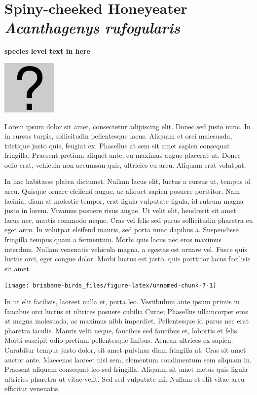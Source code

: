 \documentclass[]{book}
\let\origfigure\figure
\let\endorigfigure\endfigure
\renewenvironment{figure}[1][2] {
  \expandafter\origfigure\expandafter[H]
} {
  \endorigfigure
}
\begin{document}
\section{\texorpdfstring{Spiny-cheeked Honeyeater \emph{Acanthagenys
rufogularis}}{Spiny-cheeked Honeyeater Acanthagenys rufogularis}}\label{spiny-cheeked-honeyeater-acanthagenys-rufogularis}

\textbf{species level text in here}

\begin{figure}
\centering
\includegraphics{assets/missing.png}
\caption{No image for species}
\end{figure}

Lorem ipsum dolor sit amet, consectetur adipiscing elit. Donec sed justo
nunc. In in cursus turpis, sollicitudin pellentesque lacus. Aliquam et
orci malesuada, tristique justo quis, feugiat ex. Phasellus at sem sit
amet sapien consequat fringilla. Praesent pretium aliquet ante, eu
maximus augue placerat ut. Donec odio erat, vehicula non accumsan quis,
ultricies eu arcu. Aliquam erat volutpat.

In hac habitasse platea dictumst. Nullam lacus elit, luctus a cursus ut,
tempus id arcu. Quisque ornare eleifend augue, ac aliquet sapien posuere
porttitor. Nam lacinia, diam at molestie tempor, erat ligula vulputate
ligula, id rutrum magna justo in lorem. Vivamus posuere risus augue. Ut
velit elit, hendrerit sit amet lacus nec, mattis commodo neque. Cras vel
felis sed purus sollicitudin pharetra eu eget arcu. In volutpat eleifend
mauris, sed porta nunc dapibus a. Suspendisse fringilla tempus quam a
fermentum. Morbi quis lacus nec eros maximus interdum. Nullam venenatis
vehicula magna, a egestas est ornare vel. Fusce quis luctus orci, eget
congue dolor. Morbi luctus est justo, quis porttitor lacus facilisis sit
amet.

\begin{figure}
\texttt{[image: brisbane-birds\_files/figure-latex/unnamed-chunk-7-1]} \caption{insert figure caption}\label{fig:unnamed-chunk-7}
\end{figure}

In ut elit facilisis, laoreet nulla et, porta leo. Vestibulum ante ipsum
primis in faucibus orci luctus et ultrices posuere cubilia Curae;
Phasellus ullamcorper eros at magna malesuada, ac maximus nibh
imperdiet. Pellentesque id purus nec erat pharetra iaculis. Mauris velit
neque, faucibus sed faucibus et, lobortis et felis. Morbi suscipit odio
pretium pellentesque finibus. Aenean ultrices ex sapien. Curabitur
tempus justo dolor, sit amet pulvinar diam fringilla at. Cras sit amet
auctor ante. Maecenas laoreet nisi sem, elementum condimentum sem
aliquam in. Praesent aliquam consequat leo sed fringilla. Aliquam sit
amet metus quis ligula ultricies pharetra ut vitae velit. Sed sed
vulputate mi. Nullam et elit vitae arcu efficitur venenatis.
\end{document}
